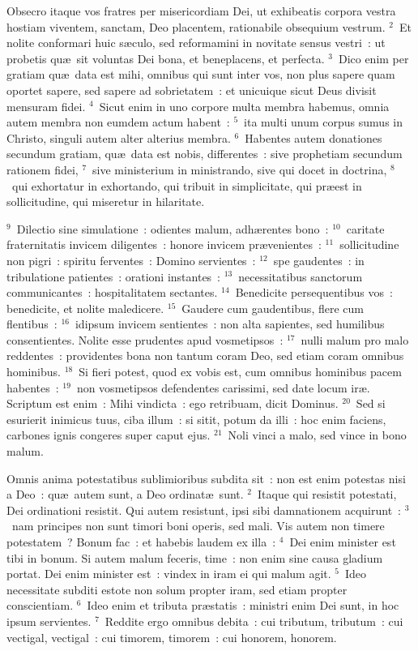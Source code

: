 \lettrine[lines=10,image=true,loversize=0.05,lraise=-0.03]{O}{}bsecro itaque vos fratres per misericordiam Dei, ut exhibeatis corpora vestra hostiam viventem, sanctam, Deo placentem, rationabile obsequium vestrum.
${}^{2}$~Et nolite conformari huic s\ae culo, sed reformamini in novitate sensus vestri~: ut probetis qu\ae\ sit voluntas Dei bona, et beneplacens, et perfecta.
${}^{3}$~Dico enim per gratiam qu\ae\ data est mihi, omnibus qui sunt inter vos, non plus sapere quam oportet sapere, sed sapere ad sobrietatem~: et unicuique sicut Deus divisit mensuram fidei.
${}^{4}$~Sicut enim in uno corpore multa membra habemus, omnia autem membra non eumdem actum habent~:
${}^{5}$~ita multi unum corpus sumus in Christo, singuli autem alter alterius membra.
${}^{6}$~Habentes autem donationes secundum gratiam, qu\ae\ data est nobis, differentes~: sive prophetiam secundum rationem fidei,
${}^{7}$~sive ministerium in ministrando, sive qui docet in doctrina,
${}^{8}$~qui exhortatur in exhortando, qui tribuit in simplicitate, qui pr\ae est in sollicitudine, qui miseretur in hilaritate.


${}^{9}$~Dilectio sine simulatione~: odientes malum, adh\ae rentes bono~:
${}^{10}$~caritate fraternitatis invicem diligentes~: honore invicem pr\ae venientes~:
${}^{11}$~sollicitudine non pigri~: spiritu ferventes~: Domino servientes~:
${}^{12}$~spe gaudentes~: in tribulatione patientes~: orationi instantes~:
${}^{13}$~necessitatibus sanctorum communicantes~: hospitalitatem sectantes.
${}^{14}$~Benedicite persequentibus vos~: benedicite, et nolite maledicere.
${}^{15}$~Gaudere cum gaudentibus, flere cum flentibus~:
${}^{16}$~idipsum invicem sentientes~: non alta sapientes, sed humilibus consentientes. Nolite esse prudentes apud vosmetipsos~:
${}^{17}$~nulli malum pro malo reddentes~: providentes bona non tantum coram Deo, sed etiam coram omnibus hominibus.
${}^{18}$~Si fieri potest, quod ex vobis est, cum omnibus hominibus pacem habentes~:
${}^{19}$~non vosmetipsos defendentes carissimi, sed date locum ir\ae . Scriptum est enim~: Mihi vindicta~: ego retribuam, dicit Dominus.
${}^{20}$~Sed si esurierit inimicus tuus, ciba illum~: si sitit, potum da illi~: hoc enim faciens, carbones ignis congeres super caput ejus.
${}^{21}$~Noli vinci a malo, sed vince in bono malum.

\lettrine[lines=10,image=true,loversize=0.05,lraise=-0.03]{O}{}mnis anima potestatibus sublimioribus subdita sit~: non est enim potestas nisi a Deo~: qu\ae\ autem sunt, a Deo ordinat\ae\ sunt.
${}^{2}$~Itaque qui resistit potestati, Dei ordinationi resistit. Qui autem resistunt, ipsi sibi damnationem acquirunt~:
${}^{3}$~nam principes non sunt timori boni operis, sed mali. Vis autem non timere potestatem~? Bonum fac~: et habebis laudem ex illa~:
${}^{4}$~Dei enim minister est tibi in bonum. Si autem malum feceris, time~: non enim sine causa gladium portat. Dei enim minister est~: vindex in iram ei qui malum agit.
${}^{5}$~Ideo necessitate subditi estote non solum propter iram, sed etiam propter conscientiam.
${}^{6}$~Ideo enim et tributa pr\ae statis~: ministri enim Dei sunt, in hoc ipsum servientes.
${}^{7}$~Reddite ergo omnibus debita~: cui tributum, tributum~: cui vectigal, vectigal~: cui timorem, timorem~: cui honorem, honorem.


